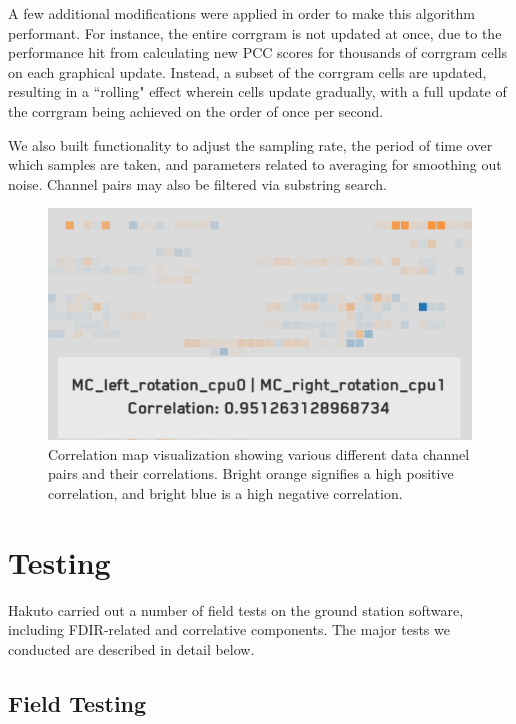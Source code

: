 A few additional modifications were applied in order to make this algorithm performant. For instance, the entire corrgram is not updated at once, due to the performance hit from calculating new PCC scores for thousands of corrgram cells on each graphical update. Instead, a subset of the corrgram cells are updated, resulting in a ``rolling" effect wherein cells update gradually, with a full update of the corrgram being achieved on the order of once per second.

We also built functionality to adjust the sampling rate, the period of time over which samples are taken, and parameters related to averaging for smoothing out noise. Channel pairs may also be filtered via substring search.

\begin{figure}[h]
\centering
    \includegraphics[width=\columnwidth]{images/corr_map.png}
    \caption{Correlation map visualization showing various different data channel pairs and their correlations. Bright orange signifies a high positive correlation, and bright blue is a high negative correlation.}
    \label{fig:corr_map}
\end{figure}

\section{Testing}

Hakuto carried out a number of field tests on the ground station software, including FDIR-related and correlative components. The major tests we conducted are described in detail below.

\subsection{Field Testing}

